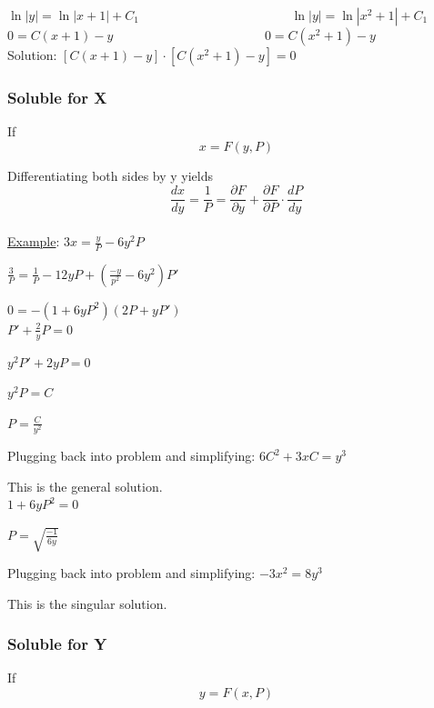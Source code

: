 \documentclass[12pt]{article}
\numberwithin{equation}{subsection}
\newcommand{\absp}[1]{\left\vert #1 \right\vert}
\newcommand{\pary}[1]{\frac{\partial #1}{\partial y}}
\newcommand{\dery}[1]{\frac{d #1}{dy}}
\newcommand{\indb}{\hspace{1cm}}
\newcommand{\indd}{\hspace{2cm}}
\newcommand{\exa}{\noindent \underline{Example}: \hspace{1cm}}
\begin{document}
\indb $\ln \absp{y}=\ln \absp{x+1} +C_1 \hspace{5cm} \ln \absp{y}=\ln \absp{x^2+1} +C_1$\\

\indb $0=C(x+1)-y \hspace{5cm} 0=C(x^2+1)-y$\\

Solution: $[C(x+1)-y]\cdot [C(x^2+1)-y] =0$

\subsubsection{Soluble for X}
If \begin{equation}
x=F(y, P)
\end{equation}

Differentiating both sides by y yields 
\begin{equation}
\dery{x}=\frac{1}{P}= \pary{F}+\frac{\partial F}{\partial P} \cdot \dery{P}
\end{equation}\\

\exa $3x=\frac{y}{P}-6y^2P$

\indb $\frac{3}{P}=\frac{1}{P}-12yP +\left( \frac{-y}{p^2} -6y^2\right)P'$

\indb $0=-(1+6yP^2)(2P+yP')$\\

\indd $P'+\frac{2}{y}P=0$

\indd $y^2P'+2yP=0$

\indd $y^2P=C$

\indd $P=\frac{C}{y^2}$

Plugging back into problem and simplifying: $6C^2+3xC=y^3$

\indd This is the general solution.\\

\indd $1+6yP^2=0$

\indd $P=\sqrt{\frac{-1}{6y}}$

Plugging back into problem and simplifying: $-3x^2=8y^3$

\indd This is the singular solution.\\

\newpage
\subsubsection{Soluble for Y}
If \begin{equation}
y=F(x, P)
\end{equation}
\end{document}
